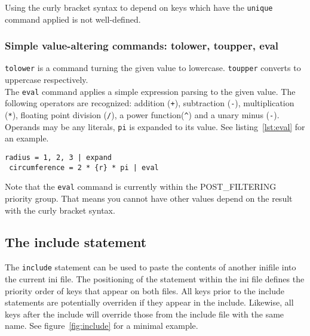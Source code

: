 \documentclass[11pt]{article}
\begin{document}
Using the curly bracket syntax to depend on keys which have the \lstinline!unique! command applied is not well-defined.

\subsubsection{Simple value-altering commands: tolower, toupper, eval}

\lstinline!tolower! is a command turning the given value to lowercase. \lstinline!toupper! converts to uppercase respectively. \\

The \lstinline!eval! command applies a simple expression parsing to the given value. The following operators are recognized: addition (\lstinline!+!), subtraction (\lstinline!-!), multiplication (\lstinline!*!), floating point division (\lstinline!/!), a power function(\lstinline!^!) and a unary minus (\lstinline!-!). Operands may be any literals, \lstinline!pi! is expanded to its value. See listing~\ref{lst:eval} for an example.

\begin{lstlisting}[caption={An example of the eval command},label=lst:eval]
 radius = 1, 2, 3 | expand
 circumference = 2 * {r} * pi | eval
\end{lstlisting}

Note that the \lstinline!eval! command is currently within the POST\_FILTERING priority group. That means you cannot have other values depend on the result with the curly bracket syntax.

\subsection{The include statement}
The \lstinline!include! statement can be used to paste the contents of another inifile into the current ini file. The positioning of the statement within the ini file defines the priority order of keys that appear on both files. All keys prior to the include statements are potentially overriden if they appear in the include. Likewise, all keys after the include will override those from the include file with the same name. See figure~\ref{fig:include} for a minimal example. \\
\end{document}
